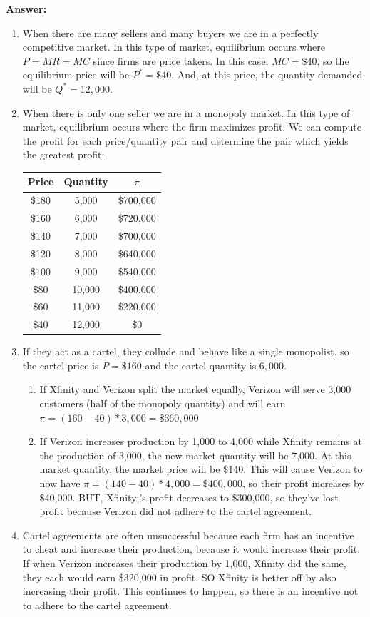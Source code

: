 \documentclass[12pt]{article}
\begin{document}
\textbf{Answer:}
\begin{enumerate}[label = (\alph*)]
    \item When there are many sellers and many buyers we are in a perfectly competitive market. In this type of market, equilibrium occurs where $P = MR = MC$ since firms are price takers. In this case, $MC = \$40$, so the equilibrium price will be $P^* = \$40$. And, at this price, the quantity demanded will be $Q^* = 12,000$.
    \item When there is only one seller we are in a monopoly market. In this type of market, equilibrium occurs where the firm maximizes profit. We can compute the profit for each price/quantity pair and determine the pair which yields the greatest profit:
    \begin{table}[H]
    \centering
    \begin{tabular}{c|c|c}
        Price & Quantity & $\pi$ \\
        \hline
        \$180 & 5,000 & \$700,000 \\ 
        \$160 & 6,000 & \$720,000 \\ 
        \$140 & 7,000 & \$700,000\\ 
        \$120 & 8,000 & \$640,000\\ 
        \$100 & 9,000 & \$540,000\\ 
        \$80 & 10,000 & \$400,000\\ 
        \$60 & 11,000 & \$220,000\\ 
        \$40 & 12,000 & \$0\\
    \end{tabular}
    
\end{table}

\item If they act as a cartel, they collude and behave like a single monopolist, so the cartel price is $P = \$160$ and the cartel quantity is $6,000$. 
\begin{enumerate}[label = (\roman*)]
    \item If Xfinity and Verizon split the market equally, Verizon will serve 3,000 customers (half of the monopoly quantity) and will earn \(\pi = (160 - 40)*3,000 = \$360,000\)
    \item If Verizon increases production by 1,000 to 4,000 while Xfinity remains at the production of 3,000, the new market quantity will be 7,000. At this market quantity, the market price will be \$140. This will cause Verizon to now have \( \pi = (140 - 40)*4,000 = \$400,000\), so their profit increases by \$40,000. BUT, Xfinity;'s profit decreases to \$300,000, so they've lost profit because Verizon did not adhere to the cartel agreement.
\end{enumerate}
    \item Cartel agreements are often unsuccessful because each firm has an incentive to cheat and increase their production, because it would increase their profit. If when Verizon increases their production by 1,000, Xfinity did the same, they each would earn \$320,000 in profit. SO Xfinity is better off by also increasing their profit. This continues to happen, so there is an incentive not to adhere to the cartel agreement.
\end{enumerate}
\end{document}
